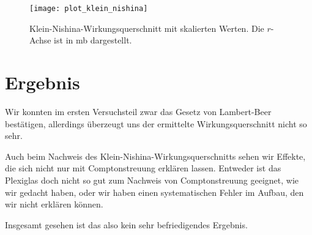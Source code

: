 \documentclass[11pt, ngerman, fleqn, DIV=15, headinclude, BCOR=2cm]{scrreprt}
\newcommand{\plotwidth}{0.8\linewidth}
\begin{document}
\begin{figure}
    \centering
    \texttt{[image: plot\_klein\_nishina]}
    \caption{%
	    Klein-Nishina-Wirkungsquerschnitt mit skalierten Werten. Die
	    $r$-Achse ist in \si{\milli\barn} dargestellt.
    }
    \label{fig:plot_klein_nishina}
\end{figure}


\chapter{Ergebnis}
Wir konnten im ersten Versuchsteil zwar das Gesetz von Lambert-Beer bestätigen,
allerdings überzeugt uns der ermittelte Wirkungsquerschnitt nicht so sehr.

Auch beim Nachweis des Klein-Nishina-Wirkungsquerschnitts sehen wir Effekte,
die sich nicht nur mit Comptonstreuung erklären lassen. Entweder ist das
Plexiglas doch nicht so gut zum Nachweis von Comptonstreuung geeignet, wie wir
gedacht haben, oder wir haben einen systematischen Fehler im Aufbau, den wir
nicht erklären können.

Insgesamt gesehen ist das also kein sehr befriedigendes Ergebnis.





\end{document}
